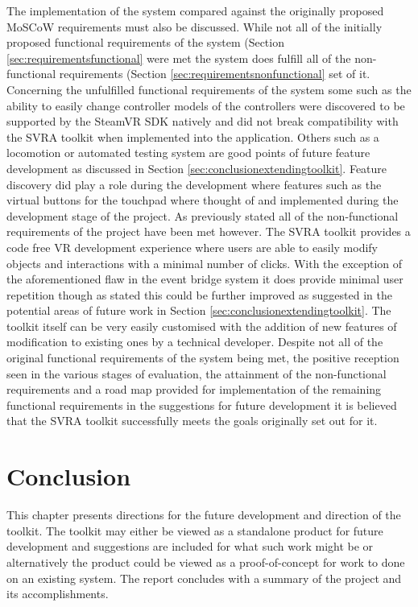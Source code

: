 \documentclass{l4proj}
\begin{document}
The implementation of the system compared against the originally proposed MoSCoW requirements must also be discussed. While not all of the initially proposed functional requirements of the system (Section \ref{sec:requirementsfunctional} were met the system does fulfill all of the non-functional requirements (Section \ref{sec:requirementsnonfunctional} set of it. Concerning the unfulfilled functional requirements of the system some such as the ability to easily change controller models of the controllers were discovered to be supported by the SteamVR SDK natively and did not break compatibility with the SVRA toolkit when implemented into the application. Others such as a locomotion or automated testing system are good points of future feature development as discussed in Section \ref{sec:conclusionextendingtoolkit}. Feature discovery did play a role during the development where features such as the virtual buttons for the touchpad where thought of and implemented during the development stage of the project. As previously stated all of the non-functional requirements of the project have been met however. The SVRA toolkit provides a code free VR development experience where users are able to easily modify objects and interactions with a minimal number of clicks. With the exception of the aforementioned flaw in the event bridge system it does provide minimal user repetition though as stated this could be further improved as suggested in the potential areas of future work in Section \ref{sec:conclusionextendingtoolkit}. The toolkit itself can be very easily customised with the addition of new features of modification to existing ones by a technical developer. Despite not all of the original functional requirements of the system being met, the positive reception seen in the various stages of evaluation, the attainment of the non-functional requirements and a road map provided for implementation of the remaining functional requirements in the suggestions for future development it is believed that the SVRA toolkit successfully meets the goals originally set out for it. 

\chapter{Conclusion}
This chapter presents directions for the future development and direction of the toolkit. The toolkit may either be viewed as a standalone product for future development and suggestions are included for what such work might be or alternatively the product could be viewed as a proof-of-concept for work to done on an existing system. The report concludes with a summary of the project and its accomplishments.
\end{document}
